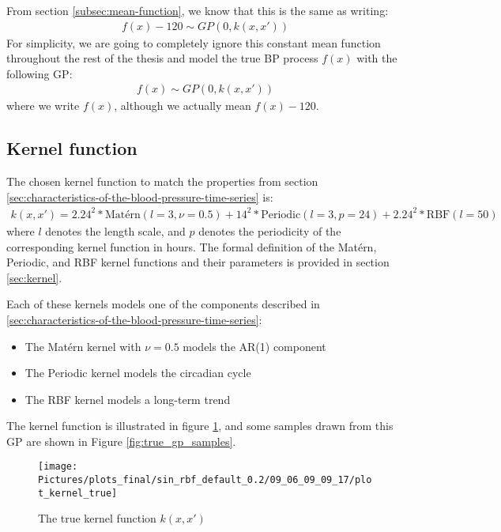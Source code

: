 From section \ref{subsec:mean-function}, we know that this is the same as writing:
\begin{gather*}
    f(x) - 120 \sim GP(0, k(x,x'))
\end{gather*}
For simplicity, we are going to completely ignore this constant
mean function throughout the rest of the thesis and
model the true BP process $f(x)$ with the following GP:
\begin{gather*}
    f(x) \sim GP(0, k(x,x'))
\end{gather*}
where we write $f(x)$, although we actually mean $f(x) - 120$.


\subsection{Kernel function}
The chosen kernel function to match the properties from
section \ref{sec:characteristics-of-the-blood-pressure-time-series} is:
\begin{gather*}\label{def:true_gp}
k(x, x') = 2.24^{2} * \text{Matérn}(l=3, \nu=0.5) +
14^{2} * \text{Periodic}(l=3, p=24) +  2.24^{2} * \text{RBF}(l=50)
\end{gather*}
where $l$ denotes the length scale, and $p$ denotes the periodicity
of the corresponding kernel function in hours.
The formal definition of the Matérn, Periodic, and RBF kernel
functions and their parameters is provided in section \ref{sec:kernel}.

Each of these kernels models one of the components described in
\ref{sec:characteristics-of-the-blood-pressure-time-series}:
\begin{itemize}
    \item The Matérn kernel with $\nu=0.5$ models the AR(1) component
    \item The Periodic kernel models the circadian cycle
    \item The RBF kernel models a long-term trend
\end{itemize}

The kernel function is illustrated in figure \ref{fig:true_kernel}, and
some samples drawn from this GP are shown in Figure \ref{fig:true_gp_samples}.

\begin{figure}[!ht]
    \centering
    \texttt{[image: Pictures/plots\_final/sin\_rbf\_default\_0.2/09\_06\_09\_09\_17/plot\_kernel\_true]}
    \caption{The true kernel function $k(x,x')$}
    \label{fig:true_kernel}
\end{figure}

